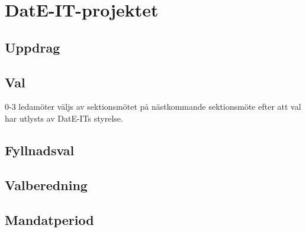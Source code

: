 \section{DatE-IT-projektet}
\subsection{Uppdrag}
\subsection{Val}
0-3 ledamöter väljs av sektionsmötet på nästkommande sektionsmöte efter att val har utlysts av DatE-ITs styrelse.
\subsection{Fyllnadsval}
\subsection{Valberedning}
\subsection{Mandatperiod}
\newpage
